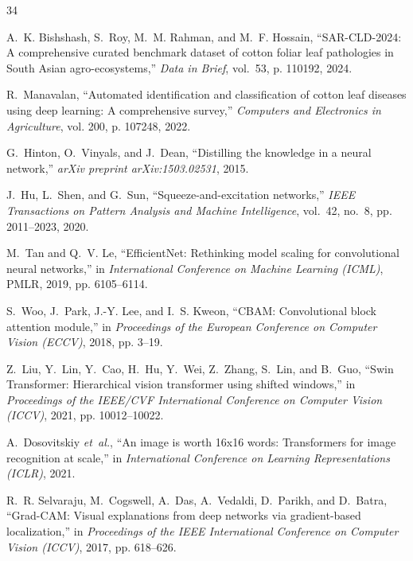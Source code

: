\documentclass[journal,10pt,twocolumn]{IEEEtran}
\begin{document}
\balance

\begin{thebibliography}{34}

A.~K. Bishshash, S.~Roy, M.~M. Rahman, and M.~F. Hossain, ``SAR-CLD-2024: A comprehensive curated benchmark dataset of cotton foliar leaf pathologies in South Asian agro-ecosystems,'' \emph{Data in Brief}, vol.~53, p. 110192, 2024.

R.~Manavalan, ``Automated identification and classification of cotton leaf diseases using deep learning: A comprehensive survey,'' \emph{Computers and Electronics in Agriculture}, vol. 200, p. 107248, 2022.

G.~Hinton, O.~Vinyals, and J.~Dean, ``Distilling the knowledge in a neural network,'' \emph{arXiv preprint arXiv:1503.02531}, 2015.

J.~Hu, L.~Shen, and G.~Sun, ``Squeeze-and-excitation networks,'' \emph{IEEE Transactions on Pattern Analysis and Machine Intelligence}, vol.~42, no.~8, pp. 2011--2023, 2020.

M.~Tan and Q.~V. Le, ``EfficientNet: Rethinking model scaling for convolutional neural networks,'' in \emph{International Conference on Machine Learning (ICML)}, PMLR, 2019, pp. 6105--6114.

S.~Woo, J.~Park, J.-Y. Lee, and I.~S. Kweon, ``CBAM: Convolutional block attention module,'' in \emph{Proceedings of the European Conference on Computer Vision (ECCV)}, 2018, pp. 3--19.

Z.~Liu, Y.~Lin, Y.~Cao, H.~Hu, Y.~Wei, Z.~Zhang, S.~Lin, and B.~Guo, ``Swin Transformer: Hierarchical vision transformer using shifted windows,'' in \emph{Proceedings of the IEEE/CVF International Conference on Computer Vision (ICCV)}, 2021, pp. 10012--10022.

A.~Dosovitskiy \emph{et~al.}, ``An image is worth 16x16 words: Transformers for image recognition at scale,'' in \emph{International Conference on Learning Representations (ICLR)}, 2021.

R.~R. Selvaraju, M.~Cogswell, A.~Das, A.~Vedaldi, D.~Parikh, and D.~Batra, ``Grad-CAM: Visual explanations from deep networks via gradient-based localization,'' in \emph{Proceedings of the IEEE International Conference on Computer Vision (ICCV)}, 2017, pp. 618--626.


\end{thebibliography}
\end{document}
